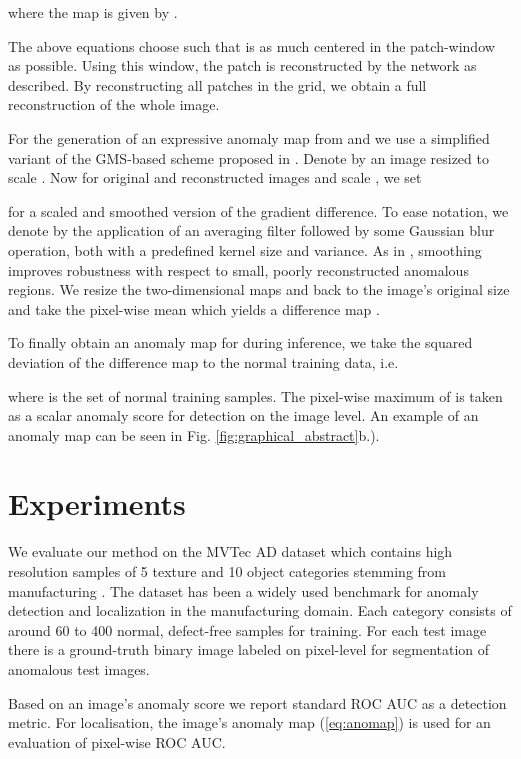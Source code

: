 \documentclass[runningheads]{llncs}
\begin{document}
where the map  is given by .

The above equations choose  such that  is as much centered in the  patch-window as possible. Using this window, the patch  is reconstructed by the network as described. By reconstructing all patches in the  grid, we obtain a full reconstruction  of the whole image.

For the generation of an expressive anomaly map from  and  we use a simplified variant of the GMS-based scheme proposed in \cite{ZAVRTANIK2021107706}. Denote by  an image  resized to scale . Now for original and reconstructed images  and scale , we set

for a scaled and smoothed version of the gradient difference. To ease notation, we denote by  the application of an averaging filter followed by some Gaussian blur operation, both with a predefined kernel size and variance. As in \cite{ZAVRTANIK2021107706}, smoothing improves robustness with respect to small, poorly reconstructed anomalous regions. We resize the two-dimensional maps  and  back to the image's original size and take the pixel-wise mean which yields a difference map .

To finally obtain an anomaly map for  during inference, we take the squared deviation of the difference map to the normal training data, i.e.

where  is the set of normal training samples. The pixel-wise maximum of  is taken as a scalar anomaly score for detection on the image level.
An example of an anomaly map can be seen in Fig. \ref{fig:graphical_abstract}b.).

\section{Experiments}
We evaluate our method on the MVTec AD dataset which contains high resolution samples of 5 texture and 10 object categories stemming from manufacturing \cite{MvtecAd2019}. The dataset has been a widely used benchmark for anomaly detection and localization in the manufacturing domain. Each category consists of around 60 to 400 normal, defect-free samples for training. For each test image there is a ground-truth binary image labeled on pixel-level for segmentation of anomalous test images.

Based on an image's anomaly score we report standard ROC AUC as a detection metric. For localisation, the image's anomaly map (\ref{eq:anomap}) is used for an evaluation of pixel-wise ROC AUC.
\end{document}

